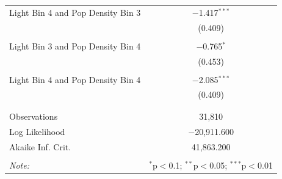 \begin{table}[!htbp]
\begin{tabular}{@{\extracolsep{5pt}}lc}
 Light Bin 4 and Pop Density Bin 3 & $-$1.417$^{***}$ \\ 
  & (0.409) \\ 
  & \\ 
 Light Bin 3 and Pop Density Bin 4 & $-$0.765$^{*}$ \\ 
  & (0.453) \\ 
  & \\ 
 Light Bin 4 and Pop Density Bin 4 & $-$2.085$^{***}$ \\ 
  & (0.409) \\ 
  & \\ 
\hline \\[-1.8ex] 
Observations & 31,810 \\ 
Log Likelihood & $-$20,911.600 \\ 
Akaike Inf. Crit. & 41,863.200 \\ 
\hline 
\hline \\[-1.8ex] 
\textit{Note:}  & \multicolumn{1}{r}{$^{*}$p$<$0.1; $^{**}$p$<$0.05; $^{***}$p$<$0.01} \\ 
\end{tabular} 
\end{table} 

